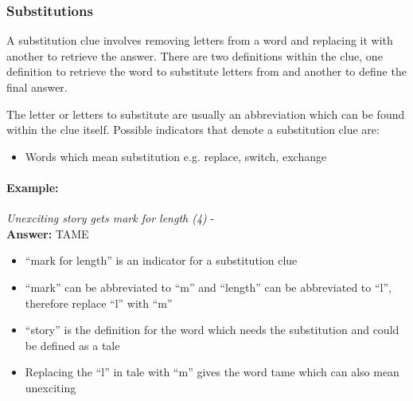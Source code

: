 \subsubsection{Substitutions}

A substitution clue involves removing letters from a word and replacing it with
another to retrieve the answer. There are two definitions within the clue, one
definition to retrieve the word to substitute letters from and another to define
the final answer.

The letter or letters to substitute are usually an abbreviation which can be
found within the clue itself. Possible indicators that denote a substitution 
clue are:

\begin{itemize} 
    \item Words which mean substitution e.g. replace, switch, exchange
\end{itemize}

\paragraph{Example:} \emph{Unexciting story gets mark for length (4)} - \citep{shuchiSubstitutions08} \\
\textbf{Answer:} TAME 

\begin{itemize}
    \item ``mark for length'' is an indicator for a substitution clue  
    \item ``mark'' can be abbreviated to ``m'' and ``length'' can be 
    abbreviated to ``l'', therefore replace ``l'' with ``m''
    \item ``story'' is the definition for the word which needs the substitution
    and could be defined as a tale 
    \item Replacing the ``l'' in tale with ``m'' gives the word tame which can
    also mean unexciting 
\end{itemize}
